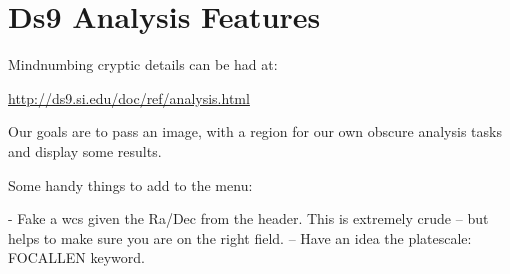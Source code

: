 \section{Ds9 Analysis Features}

Mindnumbing cryptic details can be had at:

\url{http://ds9.si.edu/doc/ref/analysis.html}

Our goals are to pass an image, with a region for our own obscure analysis
tasks and display some results.

Some handy things to add to the  menu:

- Fake a wcs given the Ra/Dec from the header. This is extremely
crude -- but helps to make sure you are on the right field.
-- Have an idea the platescale: FOCALLEN keyword.


\begingroup \fontsize{10pt}{10pt}
\selectfont
